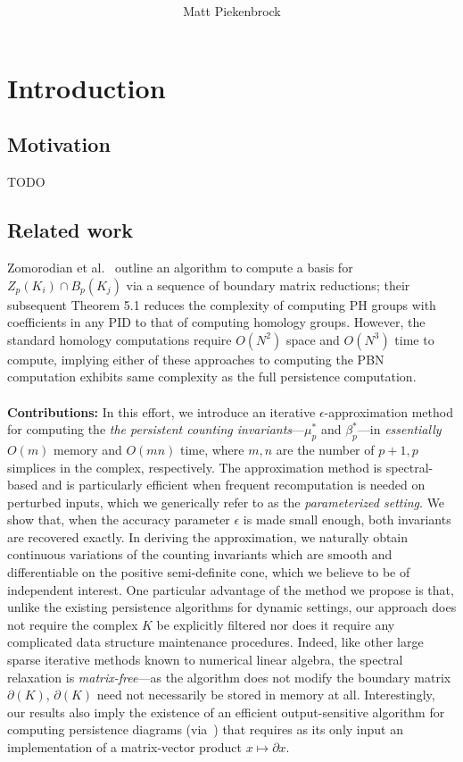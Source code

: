 \documentclass[10pt]{article}
\title{\vspace{-2.0em} \vspace{-0.5em}}
\author{Matt Piekenbrock}
\date{}
\numberwithin{equation}{section}
\newcommand{\+}{%
	\raisebox{0.18ex}{\scaleobj{0.55}{+}}
}
\theoremstyle{definition}
\begin{document}
\noindent



\section{Introduction}\label{sec:intro}
\subsection*{Motivation} TODO 
%
\subsection{Related work}\label{sec:related_work}
Zomorodian et al.~\cite{zomorodian2004computing} outline an algorithm to compute a basis for $Z_p(K_i) \cap B_p(K_j)$ via a sequence of boundary matrix reductions; their subsequent Theorem 5.1 reduces the complexity of computing PH groups with coefficients in any PID to that of computing homology groups. 
However, the standard homology computations require $O(N^2)$ space and $O(N^3)$ time to compute, implying either of these approaches to computing the PBN computation exhibits same complexity as the full persistence computation.
\\
\\
\noindent 
\textbf{Contributions: }
In this effort, we introduce an iterative $\epsilon$-approximation method for computing the \emph{the persistent counting invariants}---$\mu_p^{\ast}$ and $\beta_p^\ast$---in \emph{essentially} $O(m)$ memory and $O(mn)$ time, where $m, n$ are the number of $p+1, p$ simplices in the complex, respectively. 
The approximation method is spectral-based and is particularly efficient when frequent recomputation is needed on perturbed inputs, which we generically refer to as the \emph{parameterized setting}. 
We show that, when the accuracy parameter $\epsilon$ is made small enough, both invariants are recovered exactly. 
In deriving the approximation, we naturally obtain continuous variations of the counting invariants which are smooth and differentiable on the positive semi-definite cone, which we believe to be of independent interest. 
One particular advantage of the method we propose is that, unlike the existing persistence algorithms for dynamic settings, our approach does not require the complex $K$ be explicitly filtered nor does it require any complicated data structure maintenance procedures.
Indeed, like other large sparse iterative methods known to numerical linear algebra, the spectral relaxation is \emph{matrix-free}---as the algorithm does not modify the boundary matrix $\partial(K)$, $\partial(K)$ need not necessarily be stored in memory at all.
Interestingly, our results also imply the existence of an efficient output-sensitive algorithm for computing persistence diagrams (via~\cite{chen2011output}) that requires as its only input an implementation of a matrix-vector product $x \mapsto \partial x$. 
\end{document}
